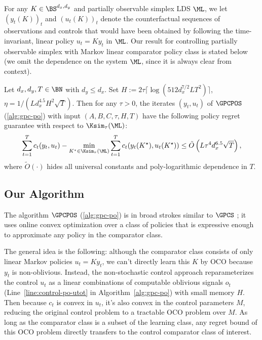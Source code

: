 For any $K \in \BS^{d_x, d_y}$ and partially observable simplex LDS $\ML$, we let $(y_t(K))_t$ and $(u_t(K))_t$ denote the counterfactual sequences of observations and controls that would have been obtained by following the time-invariant, linear policy $u_t=K y_t$ in $\ML$.
Our result for controlling partially observable simplex with Markov linear comparator policy class is stated below
(we omit the dependence on the system $\ML$, since it is always clear from context).

\begin{theorem} 
\label{thm:po-main} 
Let $d_x,d_y, T\in\BN$ with $d_y\leq d_x$. %
Set $H := 2\tau \lceil \log(512d_x^{7/2}LT^2) \rceil$, $\eta=1/(Ld_x^{4.5}H^{2}\sqrt{T})$. Then for any $\tau > 0$, the iterates  $(y_t, u_t)$ of $\GPCPOS$ (\cref{alg:gpc-po}) with input $(A, B, C, \tau, H,T)$ have the following policy regret guarantee with respect to $\Ksim_\tau(\ML)$: \begin{align*}
\sum_{t=1}^T c_t(y_t,u_t)-\min_{K^{\star}\in\Ksim_\tau(\ML)}\sum_{t=1}^T c_t(y_t(K^{\star}),u_t(K^{\star}))\le \tilde{O}\left(L\tau^{4}d_x^{6.5}\sqrt{T}\right),
\end{align*}
where $\tilde{O}(\cdot)$ hides all universal constants and poly-logarithmic dependence in $T$. 
\end{theorem}

\subsection{Our Algorithm}
\label{sec:po-alg}

The algorithm $\GPCPOS$ (\cref{alg:gpc-po}) is in broad strokes similar to $\GPCS$ \citep{golowich2024online}; it uses online convex optimization over a class of policies that is expressive enough to approximate any policy in the comparator class.

The general idea is the following: although the comparator class consists of only linear Markov policies $u_t=K y_t$, we can't directly learn this $K$ by OCO because $y_t$ is non-oblivious. Instead, the non-stochastic control approach reparameterizes the control $u_t$ as a linear combinations of computable oblivious signals $o_t$ (Line~\ref{line:control-po-utot} in Algorithm~\ref{alg:gpc-po}) with small memory $H$. Then because $c_t$ is convex in $u_t$, it's also convex in the control parameters $M$, reducing the original control problem to a tractable OCO problem over $M$. As long as the comparator class is a subset of the learning class, any regret bound of this OCO problem directly transfers to the control comparator class of interest.

